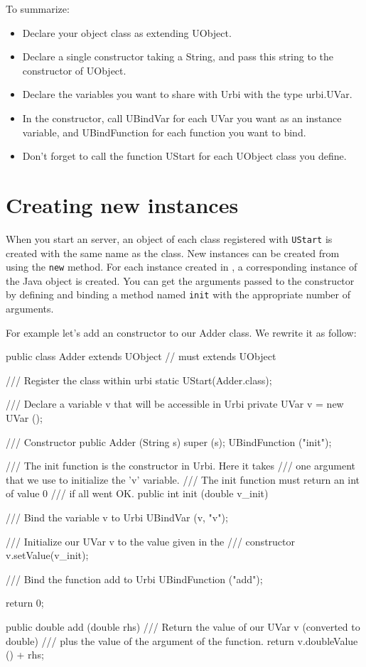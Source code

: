 To summarize:

\begin{itemize}
\item Declare your object class as extending UObject.
\item Declare a single constructor taking a String, and pass this string to
  the constructor of UObject.
\item Declare the variables you want to share with Urbi with the type
  urbi.UVar.
\item In the constructor, call UBindVar for each UVar you want as an
  instance variable, and UBindFunction for each function you want to bind.
\item Don't forget to call the function UStart for each UObject class you
  define.
\end{itemize}

\section{Creating new instances}
\label{sec:uob:apijava:new}

When you start an \urbi server, an object of each class registered with
\lstinline{UStart} is created with the same name as the class. New instances
can be created from \urbi using the \lstinline|new| method. For each
instance created in \urbi, a corresponding instance of the Java object is
created. You can get the arguments passed to the constructor by defining and
binding a method named \lstinline|init| with the appropriate number of
arguments.

For example let's add an \urbi constructor to our Adder class. We rewrite
it as follow:

\begin{java}
public class Adder extends UObject // must extends UObject
{
  /// Register the class within urbi
  static { UStart(Adder.class); }

  /// Declare a variable v that will be accessible in Urbi
  private UVar v = new UVar ();

  /// Constructor
  public Adder (String s)
  {
    super (s);
    UBindFunction ("init");
  }

  /// The init function is the constructor in Urbi. Here it takes
  /// one argument that we use to initialize the 'v' variable.
  /// The init function must return an int of value 0
  /// if all went OK.
  public int init (double v_init)
  {
    /// Bind the variable v to Urbi
    UBindVar (v, "v");

    /// Initialize our UVar v to the value given in the
    /// constructor
    v.setValue(v_init);

    /// Bind the function add to Urbi
    UBindFunction ("add");

    return 0;
  }

  public double add (double rhs)
  {
    /// Return the value of our UVar v (converted to double)
    /// plus the value of the argument of the function.
    return v.doubleValue () + rhs;
  }
}
\end{java}


